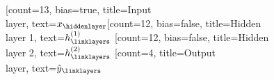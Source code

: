 \documentclass{standalone}
\begin{document}
    \begin{neuralnetwork}[height=4]
      \newcommand{\x}[2]{$x_{#2}$}
	\newcommand{\y}[2]{$\hat{y}_{#2}$}
	\newcommand{\hfirst}[2]{\small $h^{(1)}_{#2}$}
	\newcommand{\hsecond}[2]{\small $h^{(2)}_{#2}$}
        [count=13, bias=true, title=Input\\layer, text=\x]
        \hiddenlayer[count=12, bias=false, title=Hidden\\layer 1, text=\hfirst] \linklayers
        \hiddenlayer[count=12, bias=false, title=Hidden\\layer 2, text=\hsecond] \linklayers
        \outputlayer[count=4, title=Output\\layer, text=\y] \linklayers
    \end{neuralnetwork}
\end{document}
